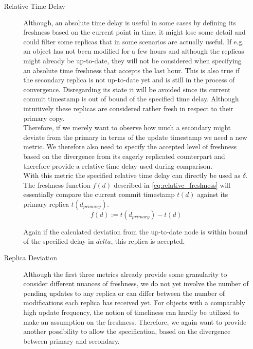 \begin{description}
    \item [Relative Time Delay] 
    Although, an absolute time delay is useful in some cases by defining its freshness based on the current point in time, 
    it might lose some detail and could filter some replicas that in some scenarios are actually useful.
    If e.g. an object has not been modified for a few hours and although the replicas might already be up-to-date, they will not be considered when specifying 
    an absolute time freshness that accepts the last hour.
    This is also true if the secondary replica is not up-to-date yet and is still in the process of convergence.
    Disregarding its state it will be avoided since its current commit timestamp is out of bound of the specified time delay.
    Although intuitively these replicas are considered rather fresh in respect to their primary copy.\\
    Therefore, if we merely want to observe how much a secondary might deviate from the primary in terms of the update timestamp we need a new metric.
    We therefore also need to specify the accepted level of freshness based on the divergence from its eagerly replicated counterpart and therefore provide a relative time delay
    used during comparison.\\
    With this metric the specified relative time delay can directly be used as $\delta$. The freshness function $f(d)$ described in \ref{eq:relative_freshness}
    will essentially compare the current commit timestamp $t(d)$ against its primary replica $t(d_{primary})$.
        \begin{equation} \label{eq:relative_freshness}
            f(d) := t(d_{primary}) - t(d)
        \end{equation}

    Again if the calculated deviation from the up-to-date node is within bound of the specified delay in $delta$, this replica is accepted.



    \item [Replica Deviation] Although the first three metrics already provide some granularity to consider different nuances of freshness, we 
        do not yet involve the number of pending updates to any replica or can differ between the number of modifications each replica has received yet.
        For objects with a comparably high update frequency, the notion of timeliness can hardly be utilized to make an assumption on the freshness.
        Therefore, we again want to provide another possibility to allow the specification, based on the divergence between primary and secondary.


\end{description}

